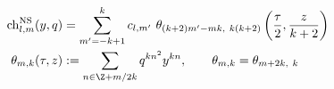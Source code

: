 \begin{equation}
  \begin{split}
    {\rm ch}_{l,m}^{\rm NS}(y,q) &= \sum_{m'=-k+1}^k c_{l,m'}
  ~\theta_{(k+2)m'-mk, ~k(k+2)} \left( {\tau\over 2}, {z \over k+2}
  \right) \\
 \theta_{m,k} (\tau, z) &:= \sum_{n\in\Z +m/2k} q^{kn^2} y^{kn}, 
 \qquad \theta_{m,k} = \theta_{m+2k,~k}
  \end{split}
\end{equation}

